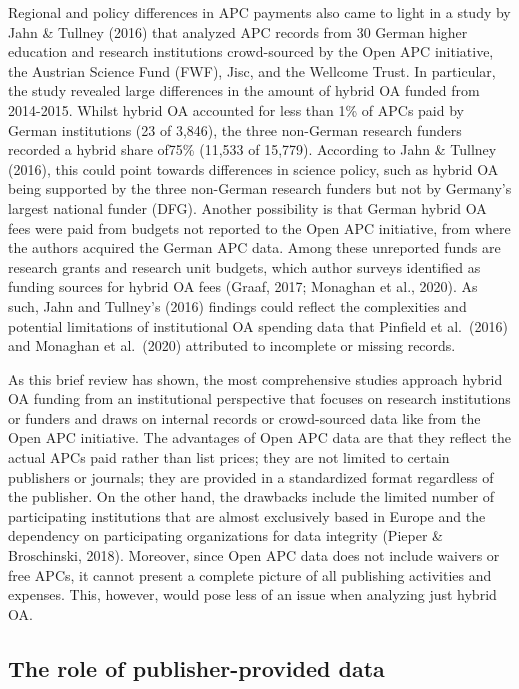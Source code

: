 \documentclass[a4paper,man,floatsintext,longtable,noextraspace,12pt]{apa6}
\begin{document}
Regional and policy differences in APC payments also came to light in a
study by Jahn \& Tullney (2016) that analyzed APC records from 30 German
higher education and research institutions crowd-sourced by the Open APC
initiative, the Austrian Science Fund (FWF), Jisc, and the Wellcome
Trust. In particular, the study revealed large differences in the amount
of hybrid OA funded from 2014-2015. Whilst hybrid OA accounted for less
than 1\% of APCs paid by German institutions (23 of 3,846), the three
non-German research funders recorded a hybrid share of75\% (11,533 of
15,779). According to Jahn \& Tullney (2016), this could point towards
differences in science policy, such as hybrid OA being supported by the
three non-German research funders but not by Germany's largest national
funder (DFG). Another possibility is that German hybrid OA fees were
paid from budgets not reported to the Open APC initiative, from where
the authors acquired the German APC data. Among these unreported funds
are research grants and research unit budgets, which author surveys
identified as funding sources for hybrid OA fees (Graaf, 2017; Monaghan
et al., 2020). As such, Jahn and Tullney's (2016) findings could reflect
the complexities and potential limitations of institutional OA spending
data that Pinfield et al.~(2016) and Monaghan et al.~(2020) attributed
to incomplete or missing records.

As this brief review has shown, the most comprehensive studies approach
hybrid OA funding from an institutional perspective that focuses on
research institutions or funders and draws on internal records or
crowd-sourced data like from the Open APC initiative. The advantages of
Open APC data are that they reflect the actual APCs paid rather than
list prices; they are not limited to certain publishers or journals;
they are provided in a standardized format regardless of the publisher.
On the other hand, the drawbacks include the limited number of
participating institutions that are almost exclusively based in Europe
and the dependency on participating organizations for data integrity
(Pieper \& Broschinski, 2018). Moreover, since Open APC data does not
include waivers or free APCs, it cannot present a complete picture of
all publishing activities and expenses. This, however, would pose less
of an issue when analyzing just hybrid OA.

\hypertarget{the-role-of-publisher-provided-data}{%
\subsection{The role of publisher-provided
data}\label{the-role-of-publisher-provided-data}}
\end{document}
